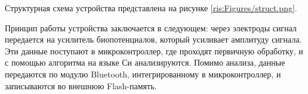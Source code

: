 \begin{sloppypar}


Структурная схема устройства представлена на рисунке \ref{ris:Figures/struct.png}.


Принцип работы устройства заключается в следующем: через электроды сигнал передается на усилитель биопотенциалов, который усиливает амплитуду сигнала. Эти данные поступают в микроконтроллер, где проходят первичную обработку, и с помощью алгоритма на языке Си анализируются. Помимо анализа, данные передаются по модулю Bluetooth, интегрированному в микроконтроллер, и записываются во внешнюю Flash-память.



\end{sloppypar}
